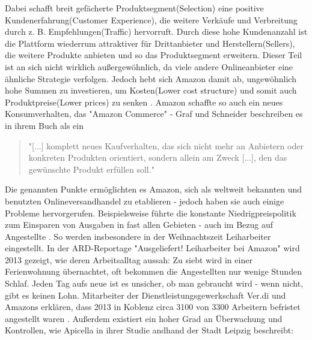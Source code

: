 Dabei schafft breit gefächerte Produktsegment(Selection) eine positive Kundenerfahrung(Customer Experience), die weitere Verkäufe und Verbreitung durch z. B. Empfehlungen(Traffic) hervorruft. Durch diese hohe Kundenanzahl ist die Plattform wiederrum attraktiver für Drittanbieter und Herstellern(Sellers), die weitere Produkte anbieten und so das Produktsegment erweitern. Dieser Teil ist an sich nicht wirklich außergewöhnlich, da viele andere Onlineanbieter eine ähnliche Strategie verfolgen. Jedoch hebt sich Amazon damit ab, ungewöhnlich hohe Summen zu investieren, um Kosten(Lower cost structure) und somit auch Produktpreise(Lower prices) zu senken \cite[S. 26f]{Graf}. Amazon schaffte so auch ein neues Konsumverhalten, das "Amazon Commerce" - Graf und Schneider beschreiben es in ihrem Buch als ein

\begin{quote}
    "[...] komplett neues Kaufverhalten, das sich nicht mehr an Anbietern oder konkreten Produkten orientiert, sondern allein am Zweck [...], den das gewünschte Produkt erfüllen soll." \cite[S. 42]{Graf}
\end{quote}
Die genannten Punkte ermöglichten es Amazon, sich als weltweit bekannten und benutzten Onlineversandhandel zu etablieren - jedoch haben sie auch einige Probleme hervorgerufen. Beispielsweise führte die konstante Niedrigpreispolitik \cite[Abb. 5]{Desjardins} zum Einsparen von Ausgaben in fast allen Gebieten - auch im Bezug auf Angestellte \cite[S. 6]{Apicella}. So werden insbesondere in der Weihnachtszeit Leiharbeiter eingestellt. In der ARD-Reportage "Ausgeliefert! Leiharbeiter bei Amazon" wird 2013 gezeigt, wie deren Arbeitsalltag aussah: Zu siebt wird in einer Ferienwohnung übernachtet, oft bekommen die Angestellten nur wenige Stunden Schlaf. Jeden Tag aufs neue ist es unsicher, ob man gebraucht wird - wenn nicht, gibt es keinen Lohn. Mitarbeiter der Dienstleistungsgewerkschaft Ver.di und Amazons erklären, dass 2013 in Koblenz circa 3100 von 3300 Arbeitern befristet angestellt waren \cite{Ausgeliefert}.
Außerdem existiert ein hoher Grad an Überwachung und Kontrollen, wie Apicella in ihrer Studie andhand der Stadt Leipzig beschreibt:

